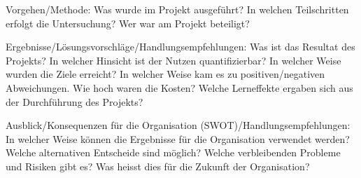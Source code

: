 Vorgehen/Methode: Was wurde im Projekt ausgeführt? In welchen Teilschritten erfolgt die Untersuchung? Wer war am Projekt beteiligt?

Ergebnisse/Lösungsvorschläge/Handlungsempfehlungen: Was ist das Resultat des Projekts? In welcher Hinsicht ist der Nutzen quantifizierbar? In welcher Weise wurden die Ziele erreicht? In welcher Weise kam es zu positiven/negativen Abweichungen. Wie hoch waren die Kosten? Welche Lerneffekte ergaben sich aus der Durchführung des Projekts?

Ausblick/Konsequenzen für die Organisation (SWOT)/Handlungsempfehlungen: In welcher Weise können die Ergebnisse für die Organisation verwendet werden? Welche alternativen Entscheide sind möglich? Welche verbleibenden Probleme und Risiken gibt es? Was heisst dies für die Zukunft der Organisation?